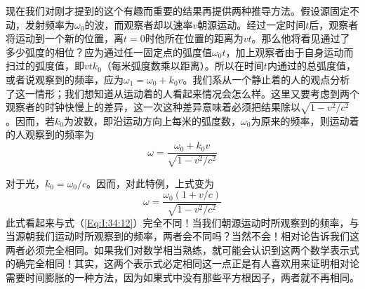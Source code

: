 现在我们对刚才提到的这个有趣而重要的结果再提供两种推导方法。假设源固定不动，发射频率为$\omega_0$的波，而观察者却以速率$v$朝源运动。经过一定时间$t$后，观察者将运动到一个新的位置，离$t=0$时他所在位置的距离为$vt$。那么他将看见通过了多少弧度的相位？应为通过任一固定点的弧度值$\omega_0t$，加上观察者由于自身运动而扫过的弧度值，即$vtk_0$（每米弧度数乘以距离）。所以在时间$t$内通过的总弧度值，或者说观察到的频率，应为$\omega_1=\omega_0+k_0v$。我们系从一个静止着的人的观点分析了这一情形；我们想知道从运动着的人看起来情况会怎么样。这里又要考虑到两个观察者的时钟快慢上的差异，这一次这种差异意味着必须把结果除以$\sqrt{1-v^2/c^2}$。因而，若$k_0$为波数，即沿运动方向上每米的弧度数，$\omega_0$为原来的频率，则运动着的人观察到的频率为
\begin{equation}
    \label{Eq:I:34:13}
    \omega = \frac{\omega_0 + k_0v}{\sqrt{1-v^2/c^2}}
\end{equation}

对于光，$k_0=\omega_0/c$。因而，对此特例，上式变为
\begin{equation}
    \label{Eq:I:34:14}
    \omega = \frac{\omega_0(1 + v/c)}{\sqrt{1-v^2/c^2}}
\end{equation}
此式看起来与式（\ref{Eq:I:34:12}）完全不同！当我们朝源运动时所观察到的频率，与当源朝我们运动时所观察到的频率，两者会不同吗？当然不会！相对论告诉我们这两者必须完全相同。如果我们对数学相当熟练，就可能会认识到这两个数学表示式的确完全相同！其实，这两个表示式必定相同这一点正是有人喜欢用来证明相对论需要时间膨胀的一种方法，因为如果式中没有那些平方根因子，两者就不再相同。

